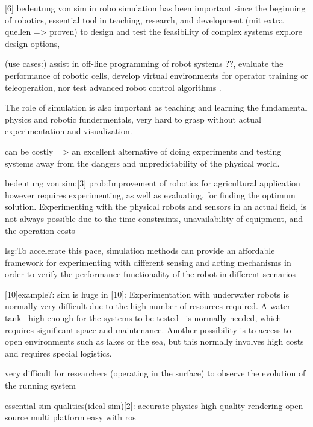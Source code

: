 \documentclass[german,version-2020-11]{uzl-thesis}
\begin{document}
	[6] bedeutung von sim in robo
      simulation has been important since the beginning of robotics,
      essential tool in teaching, research, and development  (mit extra quellen => proven)
      to design and test the feasibility of complex systems
      explore design options, 
      
      (use cases:)
      assist in off-line programming of robot systems ??,
       evaluate the performance of robotic cells,
      develop virtual environments for operator training or teleoperation, 
      nor test advanced robot control algorithms .
      
      The role of simulation is also important as teaching and learning the fundamental physics and robotic fundermentals, very hard to grasp without actual experimentation and visualization. 
      
      can be costly => an excellent alternative of doing experiments and testing systems away from the dangers and unpredictability of the physical world.
	
      bedeutung von sim:[3]
      prob:Improvement of robotics for agricultural application however requires experimenting, as well as evaluating, for finding the optimum solution. Experimenting with the physical robots and sensors in an actual field, is not always possible due to the time constraints, unavailability of equipment, and the operation costs
      
      lsg:To accelerate this pace, simulation methods can provide an affordable framework for experimenting with different sensing and acting mechanisms in order to verify the performance functionality of the robot in different scenarios
  

	[10]example?: sim is huge in [10]:
        Experimentation with underwater robots is normally very difficult due to the high number of resources required.
          A water tank –high enough for the systems to be tested– is normally needed, 
            which requires significant space and maintenance. 
          Another possibility is to access to open environments such as lakes or the sea, but this normally involves high costs and requires special logistics. 
          
          very difficult for researchers (operating in the surface) to observe the evolution of the running system



essential sim qualities(ideal sim)[2]:
	accurate physics
	high quality rendering
	open source
	multi platform
	easy with ros
\end{document}
